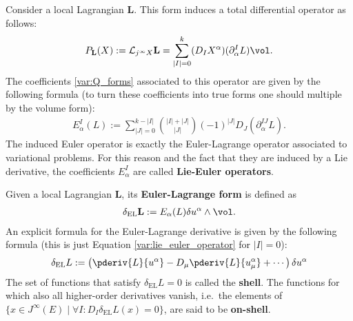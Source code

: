     \begin{example}
        Consider a local Lagrangian $\mathbf{L}$. This form induces a total differential operator as follows:
        \begin{gather}
            P_{\mathbf{L}}(X) := \mathcal{L}_{j^\infty X}\mathbf{L} = \sum_{|I|=0}^k(D_IX^\alpha)(\partial^I_\alpha L)\vol.
        \end{gather}
        The coefficients \eqref{var:Q_forms} associated to this operator are given by the following formula (to turn these coefficients into true forms one should multiple by the volume form):
        \begin{gather}
            \label{var:lie_euler_operator}
            E^I_\alpha(L) := \sum_{|J|=0}^{k-|I|}\binom{|I|+|J|}{|J|}(-1)^{|J|}D_J\left(\partial^{IJ}_\alpha L\right).
        \end{gather}
        The induced Euler operator is exactly the Euler-Lagrange operator associated to variational problems. For this reason and the fact that they are induced by a Lie derivative, the coefficients $E^I_\alpha$ are called \textbf{Lie-Euler operators}.

        Given a local Lagrangian $\mathbf{L}$, its \textbf{Euler-Lagrange form} is defined as
        \begin{gather}
            \delta_\mathrm{EL}\mathbf{L} := E_\alpha(L)\delta u^\alpha\wedge\vol.
        \end{gather}
        An explicit formula for the Euler-Lagrange derivative is given by the following formula (this is just Equation \eqref{var:lie_euler_operator} for $|I|=0$):
        \begin{gather}
            \label{var:euler_lagrange_derivative}
            \delta_\mathrm{EL}L := \left(\pderiv{L}{u^\alpha} - D_\mu\pderiv{L}{u^\alpha_\mu} + \cdots\right)\delta u^\alpha
        \end{gather}
        The set of functions that satisfy $\delta_\mathrm{EL}L=0$ is called the \textbf{shell}. The functions for which also all higher-order derivatives vanish, i.e.~the elements of $\{x\in J^\infty(E)\mid\forall I:D_I\delta_\mathrm{EL}L(x) = 0\}$, are said to be \textbf{on-shell}.
    \end{example}

